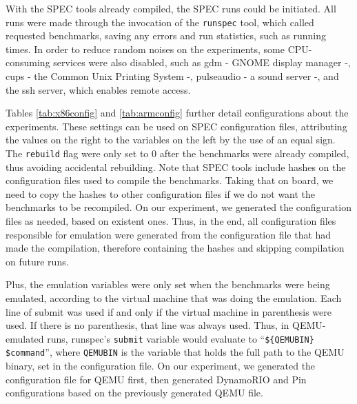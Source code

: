 \documentclass[11pt,twoside]{article}
\begin{document}
  With the SPEC tools %
  already compiled, the SPEC runs could be initiated.
  All runs were made through the invocation of the 
  \texttt{runspec} tool, which called requested benchmarks, saving
  any errors and run statistics, such as running times. In order to 
  reduce random noises on the experiments, some CPU-consuming
  services were also disabled, such as gdm - GNOME
  display manager -, cups - the Common Unix Printing System -,
  pulseaudio - a sound server -, and the ssh server, which enables
  remote access.

  Tables \ref{tab:x86config} and \ref{tab:armconfig} further
  detail configurations about the experiments.
  These settings can be used on SPEC configuration files,
  attributing the values on the right to the variables on the left
  by the use of an equal sign. The {\tt rebuild} flag
  were only set to 0 after the benchmarks were already compiled,
  thus avoiding accidental rebuilding.
  Note that SPEC tools include hashes on the configuration files
  used to compile the benchmarks. Taking that on board,
  we need to copy the hashes to other configuration files
  if we do not want the benchmarks to be recompiled.
  On our experiment, we generated the configuration files as needed,
  based on existent ones. Thus, in the end,
  all configuration files responsible for emulation
  were generated from the configuration file that had made
  the compilation, therefore containing the hashes and skipping
  compilation on future runs.
  
  Plus, the emulation variables were only set when the benchmarks
  were being emulated, according to the virtual machine that was
  doing the emulation.
  Each line of submit was used if and only if the virtual machine
  in parenthesis were used.
  If there is no parenthesis, that line was always used.
  Thus, in QEMU-emulated runs, runspec's
  {\tt submit} variable would evaluate to
  ``{\tt \$\{QEMUBIN\} \$command}'', where {\tt QEMUBIN}
  is the variable that holds the full path to the QEMU binary,
  set in the configuration file. On our experiment, we generated the
  configuration file for QEMU first, then generated DynamoRIO and
  Pin configurations based on the previously generated QEMU file.
\end{document}

